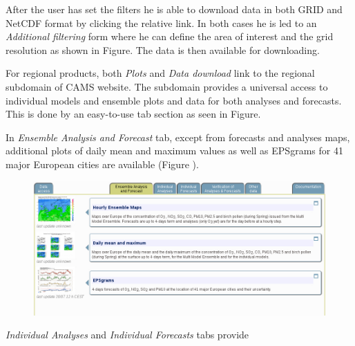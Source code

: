 \documentclass[9pt]{report}
\begin{document}
After the user has set the filters he is able to download data in both GRID and NetCDF format by clicking the relative link.
In both cases he is led to an \emph{Additional filtering} form where he can define the area of interest and the grid resolution as shown in Figure.
The data is then available for downloading.%

For regional products, both \emph{Plots} and \emph{Data download} link to the regional subdomain of CAMS website.
The subdomain provides a universal access to individual models and ensemble plots and data for both analyses and forecasts.
This is done by an easy-to-use tab section as seen in Figure.%

In \emph{Ensemble Analysis and Forecast} tab, except from forecasts and analyses maps, additional plots of daily mean and maximum values as well as EPSgrams for 41 major European cities are available (Figure ).%

\begin{figure}[h!]%
\begin{mdcenter}%

\noindent{}\includegraphics[keepaspectratio=true,width=\dimmin{}{\dimwidth{0.90}}]{images/ensemble_tab}{}%

\mdhr{}%

\noindent{}%
\end{mdcenter}\label{ensemble-tab}%
\end{figure}%

\emph{Individual Analyses} and \emph{Individual Forecasts} tabs provide%
\end{document}
